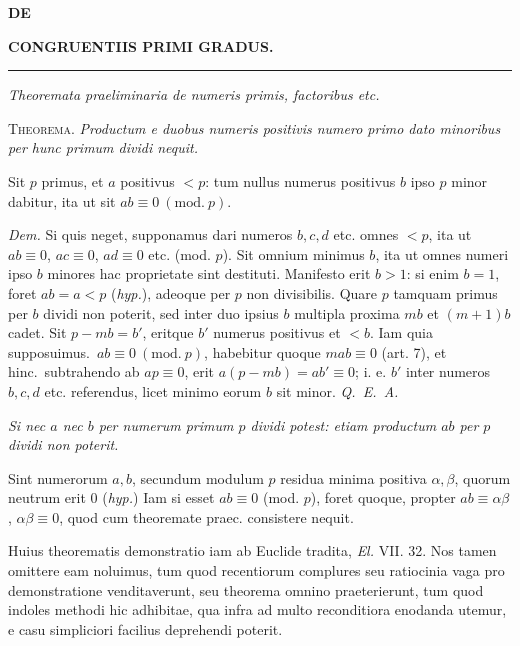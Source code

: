 \begin{center}
{\large\bfseries{}}\par\bigskip
{\small\bfseries DE}\par\bigskip
{\large\bfseries CONGRUENTIIS PRIMI GRADUS.}
\end{center}
\begin{center}\rule{0.09\linewidth}{0.3pt}\end{center}
\begin{center}\emph{Theoremata praeliminaria de numeris primis, factoribus etc.}\end{center}
\textsc{Theorema}. \emph{Productum e duobus numeris positivis numero primo dato minoribus per hunc primum dividi nequit.}

Sit $p$ primus, et $a$ positivus $<p$: tum nullus numerus positivus $b$ ipso $p$ minor dabitur, ita ut sit $ab\equiv 0\ (\mathrm{mod.}\ p)$.

\emph{Dem.} Si quis neget, supponamus dari numeros $b, c, d$ etc. omnes $<p$, ita ut $ab\equiv 0$, $ac\equiv 0$, $ad\equiv 0$ etc. (mod. $p$). Sit omnium minimus $b$, ita ut omnes numeri ipso $b$ minores hac proprietate sint destituti. Manifesto erit $b>1$: si enim $b=1$, foret $ab=a<p$ (\emph{hyp.}), adeoque per $p$ non divisibilis. Quare $p$ tamquam primus per $b$ dividi non poterit, sed inter duo ipsius $b$ multipla proxima $mb$ et $(m+1)b$ cadet. Sit $p-mb=b'$, eritque $b'$ numerus positivus et $<b$. Iam quia supposuimus.\ $ab\equiv 0\ (\mathrm{mod.}\ p)$, habebitur quoque $mab\equiv 0$ (art. 7), et hinc.\ subtrahendo ab $ap\equiv 0$, erit $a(p-mb)=ab'\equiv 0$; i. e. $b'$ inter numeros $b, c, d$ etc. referendus, licet minimo eorum $b$ sit minor. \emph{Q.~E.~A.}

\emph{Si nec $a$ nec $b$ per numerum primum $p$ dividi potest: etiam productum $ab$ per $p$ dividi non poterit.}

Sint numerorum $a, b$, secundum modulum $p$ residua minima positiva $\alpha, \beta$, quorum neutrum erit $0$ (\emph{hyp.}) Iam si esset $ab\equiv 0$ (mod. $p$), foret quoque, propter $ab\equiv\alpha\beta$, $\alpha\beta\equiv 0$, quod cum theoremate praec. consistere nequit.

Huius theorematis demonstratio iam ab Euclide tradita, \emph{El.} VII. 32. Nos tamen omittere eam noluimus, tum quod recentiorum complures seu ratiocinia vaga pro demonstratione venditaverunt, seu theorema omnino praeterierunt, tum quod indoles methodi hic adhibitae, qua infra ad multo reconditiora enodanda utemur, e casu simpliciori facilius deprehendi poterit.

